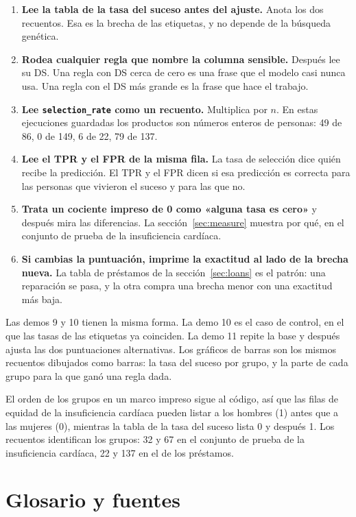 \documentclass[11pt]{article}
\newcommand{\fn}[1]{\texttt{\small #1}}
\begin{document}
\begin{enumerate}
  \item \textbf{Lee la tabla de la tasa del suceso antes del ajuste.} Anota los dos recuentos. Esa es la brecha de las etiquetas, y no depende de la búsqueda genética.
  \item \textbf{Rodea cualquier regla que nombre la columna sensible.} Después lee su DS. Una regla con DS cerca de cero es una frase que el modelo casi nunca usa. Una regla con el DS más grande es la frase que hace el trabajo.
  \item \textbf{Lee \fn{selection\_rate} como un recuento.} Multiplica por \(n\). En estas ejecuciones guardadas los productos son números enteros de personas: 49 de 86, 0 de 149, 6 de 22, 79 de 137.
  \item \textbf{Lee el TPR y el FPR de la misma fila.} La tasa de selección dice quién recibe la predicción. El TPR y el FPR dicen si esa predicción es correcta para las personas que vivieron el suceso y para las que no.
  \item \textbf{Trata un cociente impreso de 0 como «alguna tasa es cero»} y después mira las diferencias. La sección~\ref{sec:measure} muestra por qué, en el conjunto de prueba de la insuficiencia cardíaca.
  \item \textbf{Si cambias la puntuación, imprime la exactitud al lado de la brecha nueva.} La tabla de préstamos de la sección~\ref{sec:loans} es el patrón: una reparación se pasa, y la otra compra una brecha menor con una exactitud más baja.
\end{enumerate}

Las demos 9 y 10 tienen la misma forma. La demo 10 es el caso de control, en el que las tasas de las etiquetas ya coinciden. La demo 11 repite la base y después ajusta las dos puntuaciones alternativas. Los gráficos de barras son los mismos recuentos dibujados como barras: la tasa del suceso por grupo, y la parte de cada grupo para la que ganó una regla dada.

El orden de los grupos en un marco impreso sigue al código, así que las filas de equidad de la insuficiencia cardíaca pueden listar a los hombres (1) antes que a las mujeres (0), mientras la tabla de la tasa del suceso lista 0 y después 1. Los recuentos identifican los grupos: 32 y 67 en el conjunto de prueba de la insuficiencia cardíaca, 22 y 137 en el de los préstamos.

\section{Glosario y fuentes}
\label{sec:glossary}
\end{document}
